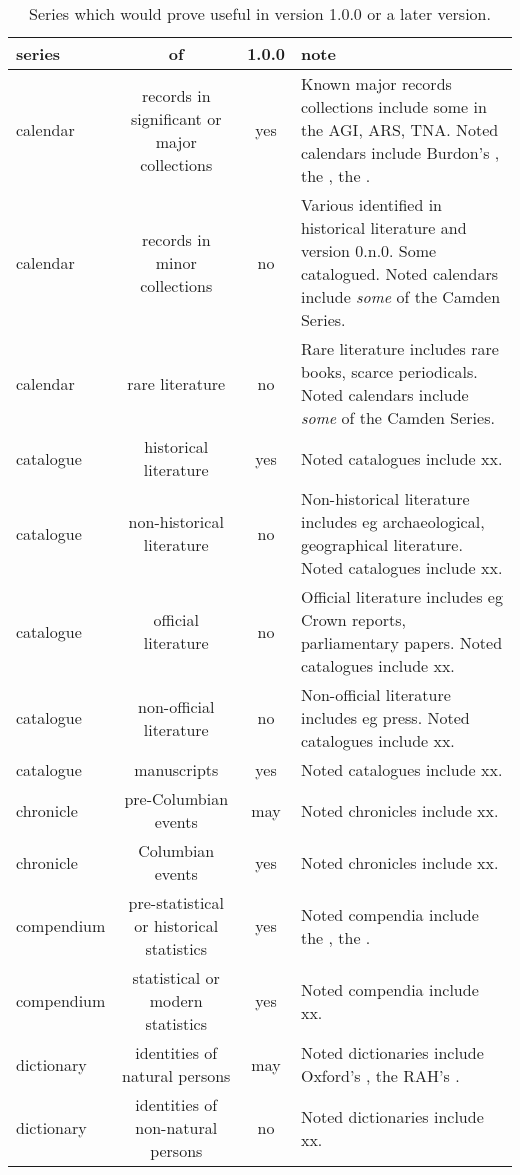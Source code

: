 \begin{table}[h]%
\caption{Series which would prove useful in version 1.0.0 or a later version.}%
\label{t:series}%
\begin{tabularx}{\textwidth}{lScL}
\toprule
series & of & 1.0.0 & note\\
\midrule
calendar & records in significant or major collections & yes & Known major records collections include some in the AGI, ARS, TNA. Noted calendars include Burdon's , the , the .\\
calendar & records in minor collections & no & Various identified in historical literature and version 0.n.0. Some catalogued. Noted calendars include \emph{some} of the Camden Series.\\
calendar & rare literature & no & Rare literature includes rare books, scarce periodicals. Noted calendars include \emph{some} of the Camden Series.\\
catalogue & historical literature & yes & Noted catalogues include xx.\\
catalogue & non-historical literature & no & Non-historical literature includes eg archaeological, geographical literature. Noted catalogues include xx.\\
catalogue & official literature & no & Official literature includes eg Crown reports, parliamentary papers. Noted catalogues include xx.\\
catalogue & non-official literature & no & Non-official literature includes eg press. Noted catalogues include xx.\\
catalogue & manuscripts & yes & Noted catalogues include xx.\\
chronicle & pre-Columbian events & may & Noted chronicles include xx.\\
chronicle & Columbian events & yes & Noted chronicles include xx.\\
compendium & pre-statistical or historical statistics & yes & Noted compendia include the , the .\\
compendium & statistical or modern statistics & yes & Noted compendia include xx.%
\\
dictionary & identities of natural persons & may & Noted dictionaries include Oxford's , the RAH's .\\
dictionary & identities of non-natural persons & no & Noted dictionaries include xx.\\

\end{tabularx}
\end{table}

